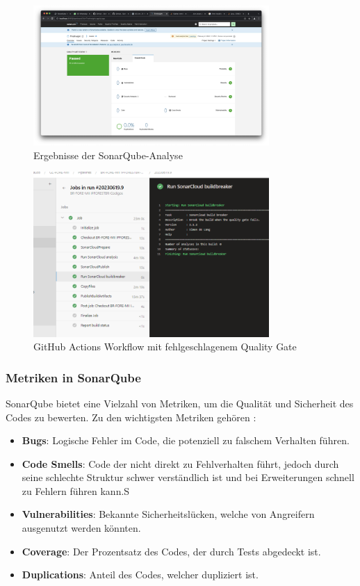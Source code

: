 \begin{figure}[h!]
\centering
\includegraphics[width=0.8\textwidth]{img/sonarqube_results.jpeg}
\caption{Ergebnisse der SonarQube-Analyse}
\label{fig:sonarqube_results}
\end{figure}

\begin{figure}[h!]
\centering
\includegraphics[width=0.8\textwidth]{img/github_actions_failed_quality_gate.png}
\caption{GitHub Actions Workflow mit fehlgeschlagenem Quality Gate}
\label{fig:github_actions_failed_quality_gate}
\end{figure}

\subsubsection{Metriken in SonarQube}

SonarQube bietet eine Vielzahl von Metriken, um die Qualität und Sicherheit des Codes zu bewerten. Zu den wichtigsten Metriken gehören \cite{SonarSource2021b}:

\begin{itemize}
    \item \textbf{Bugs}: Logische Fehler im Code, die potenziell zu falschem Verhalten führen.
    \item \textbf{Code Smells}: Code der nicht direkt zu Fehlverhalten führt, jedoch durch seine schlechte Struktur schwer verständlich ist und bei Erweiterungen schnell zu Fehlern führen kann.S
    \item \textbf{Vulnerabilities}: Bekannte Sicherheitslücken, welche von Angreifern ausgenutzt werden könnten.
    \item \textbf{Coverage}: Der Prozentsatz des Codes, der durch Tests abgedeckt ist.
    \item \textbf{Duplications}: Anteil des Codes, welcher dupliziert ist.
\end{itemize}

